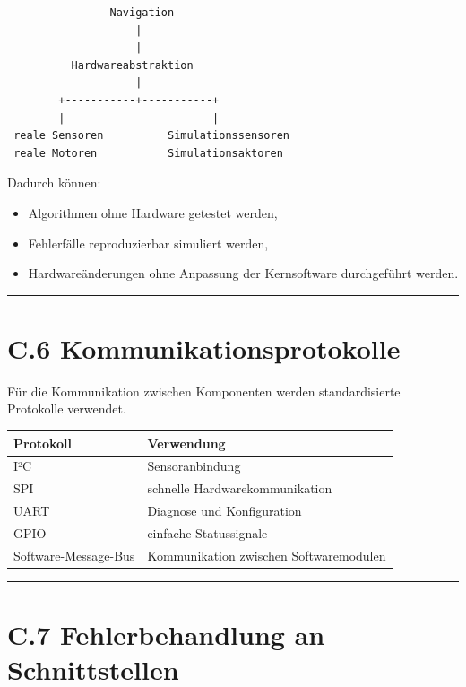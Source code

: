 \documentclass[
  a4paper,
  12pt,
  DIV=12,        %
  parskip=half,  %
  headings=small %
]{scrartcl}
\theoremstyle{definition}
\providecommand{\tightlist}{%
  \setlength{\itemsep}{0pt}\setlength{\parskip}{0pt}}
\theoremstyle{definition}
\providecommand{\tightlist}{%
  \setlength{\itemsep}{0pt}\setlength{\parskip}{0pt}}
\begin{document}
\begin{verbatim}
                Navigation
                    |
                    |
          Hardwareabstraktion
                    |
        +-----------+-----------+
        |                       |
 reale Sensoren          Simulationssensoren
 reale Motoren           Simulationsaktoren
\end{verbatim}

Dadurch können:

\begin{itemize}
\tightlist
\item
  Algorithmen ohne Hardware getestet werden,
\item
  Fehlerfälle reproduzierbar simuliert werden,
\item
  Hardwareänderungen ohne Anpassung der Kernsoftware durchgeführt
  werden.
\end{itemize}

\begin{center}\rule{0.5\linewidth}{0.5pt}\end{center}

\section{C.6
Kommunikationsprotokolle}\label{c.6-kommunikationsprotokolle}

Für die Kommunikation zwischen Komponenten werden standardisierte
Protokolle verwendet.

\begin{longtable}[]{@{}ll@{}}
\toprule\noalign{}
Protokoll & Verwendung \\
\midrule\noalign{}
\endhead
\bottomrule\noalign{}
\endlastfoot
I²C & Sensoranbindung \\
SPI & schnelle Hardwarekommunikation \\
UART & Diagnose und Konfiguration \\
GPIO & einfache Statussignale \\
Software-Message-Bus & Kommunikation zwischen Softwaremodulen \\
\end{longtable}

\begin{center}\rule{0.5\linewidth}{0.5pt}\end{center}

\section{C.7 Fehlerbehandlung an
Schnittstellen}\label{c.7-fehlerbehandlung-an-schnittstellen}
\end{document}
